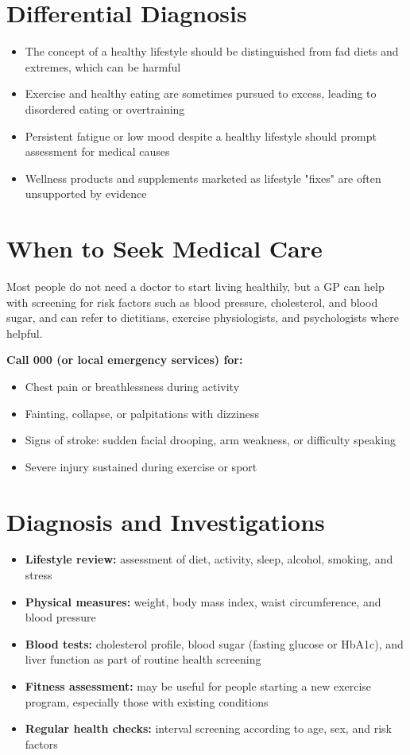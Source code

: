 \section*{Differential Diagnosis}
\begin{itemize}
    \item The concept of a healthy lifestyle should be distinguished from fad diets and extremes, which can be harmful
    \item Exercise and healthy eating are sometimes pursued to excess, leading to disordered eating or overtraining
    \item Persistent fatigue or low mood despite a healthy lifestyle should prompt assessment for medical causes
    \item Wellness products and supplements marketed as lifestyle "fixes" are often unsupported by evidence
\end{itemize}

\section*{When to Seek Medical Care}
Most people do not need a doctor to start living healthily, but a GP can help with screening for risk factors such as blood pressure, cholesterol, and blood sugar, and can refer to dietitians, exercise physiologists, and psychologists where helpful.

\textbf{Call 000 (or local emergency services) for:}
\begin{itemize}
    \item Chest pain or breathlessness during activity
    \item Fainting, collapse, or palpitations with dizziness
    \item Signs of stroke: sudden facial drooping, arm weakness, or difficulty speaking
    \item Severe injury sustained during exercise or sport
\end{itemize}

\section*{Diagnosis and Investigations}
\begin{itemize}
    \item \textbf{Lifestyle review:} assessment of diet, activity, sleep, alcohol, smoking, and stress
    \item \textbf{Physical measures:} weight, body mass index, waist circumference, and blood pressure
    \item \textbf{Blood tests:} cholesterol profile, blood sugar (fasting glucose or HbA1c), and liver function as part of routine health screening
    \item \textbf{Fitness assessment:} may be useful for people starting a new exercise program, especially those with existing conditions
    \item \textbf{Regular health checks:} interval screening according to age, sex, and risk factors
\end{itemize}

